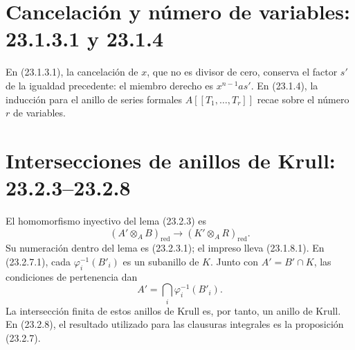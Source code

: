 \documentclass[11pt,a4paper]{article}
\begin{document}
\section*{Cancelación y número de variables: 23.1.3.1 y 23.1.4}
En (23.1.3.1), la cancelación de $x$, que no es divisor de cero, conserva
el factor $s'$ de la igualdad precedente: el miembro derecho es
$x^{n-1}as'$.
En (23.1.4), la inducción para el anillo de series formales
$A[[T_1,\ldots,T_r]]$ recae sobre el número $r$ de variables.

\section*{Intersecciones de anillos de Krull: 23.2.3--23.2.8}
El homomorfismo inyectivo del lema (23.2.3) es
\[
(A'\otimes_A B)_{\mathrm{red}}
\longrightarrow (K'\otimes_A R)_{\mathrm{red}}.
\]
Su numeración dentro del lema es (23.2.3.1); el impreso lleva (23.1.8.1).
En (23.2.7.1), cada $\varphi_i^{-1}(B'_i)$ es un subanillo de $K$.
Junto con $A'=B'\cap K$, las condiciones de pertenencia dan
\[
A'=\bigcap_i\varphi_i^{-1}(B'_i).
\]
La intersección finita de estos anillos de Krull es, por tanto, un anillo
de Krull. En (23.2.8), el resultado utilizado para las clausuras integrales
es la proposición (23.2.7).
\end{document}
